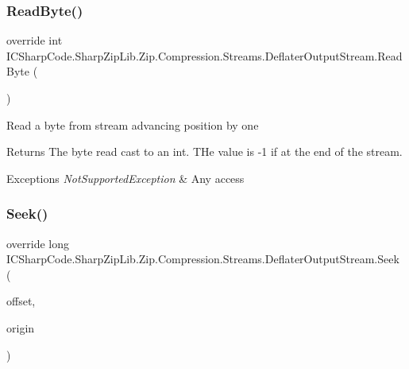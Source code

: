 \subsubsection{\texorpdfstring{Read\+Byte()}{ReadByte()}\hspace{0.1cm}{\footnotesize\ttfamily [2/2]}}
{\footnotesize\ttfamily override int I\+C\+Sharp\+Code.\+Sharp\+Zip\+Lib.\+Zip.\+Compression.\+Streams.\+Deflater\+Output\+Stream.\+Read\+Byte (\begin{DoxyParamCaption}{ }\end{DoxyParamCaption})\hspace{0.3cm}{\ttfamily [inline]}}



Read a byte from stream advancing position by one 

\begin{DoxyReturn}{Returns}
The byte read cast to an int. T\+He value is -\/1 if at the end of the stream.
\end{DoxyReturn}

\begin{DoxyExceptions}{Exceptions}
{\em Not\+Supported\+Exception} & Any access\\
\hline
\end{DoxyExceptions}
\mbox{\label{class_i_c_sharp_code_1_1_sharp_zip_lib_1_1_zip_1_1_compression_1_1_streams_1_1_deflater_output_stream_a8b1da4accf17592cb5fd485fcab1ac26}} 
\subsubsection{\texorpdfstring{Seek()}{Seek()}\hspace{0.1cm}{\footnotesize\ttfamily [1/2]}}
{\footnotesize\ttfamily override long I\+C\+Sharp\+Code.\+Sharp\+Zip\+Lib.\+Zip.\+Compression.\+Streams.\+Deflater\+Output\+Stream.\+Seek (\begin{DoxyParamCaption}\item[{long}]{offset,  }\item[{Seek\+Origin}]{origin }\end{DoxyParamCaption})\hspace{0.3cm}{\ttfamily [inline]}}



